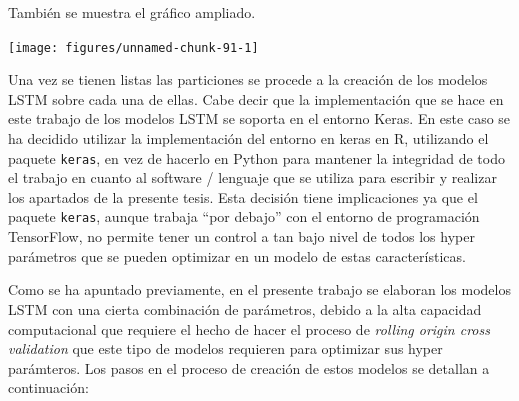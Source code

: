 \documentclass[]{DissertateUSU}
\begin{document}
\setlength\parskip{5ex}
\justifying

\noindent También se muestra el gráfico ampliado.

\begin{center}\texttt{[image: figures/unnamed-chunk-91-1]} \end{center}
\centering

\setlength\parskip{5ex}
\justifying

\noindent Una vez se tienen listas las particiones se procede a la
creación de los modelos LSTM sobre cada una de ellas. Cabe decir que la
implementación que se hace en este trabajo de los modelos LSTM se
soporta en el entorno Keras. En este caso se ha decidido utilizar la
implementación del entorno en keras en R, utilizando el paquete
\texttt{keras}, en vez de hacerlo en Python para mantener la integridad
de todo el trabajo en cuanto al software / lenguaje que se utiliza para
escribir y realizar los apartados de la presente tesis. Esta decisión
tiene implicaciones ya que el paquete \texttt{keras}, aunque trabaja
``por debajo'' con el entorno de programación TensorFlow, no permite
tener un control a tan bajo nivel de todos los hyper parámetros que se
pueden optimizar en un modelo de estas características.

\noindent Como se ha apuntado previamente, en el presente trabajo se
elaboran los modelos LSTM con una cierta combinación de parámetros,
debido a la alta capacidad computacional que requiere el hecho de hacer
el proceso de \emph{rolling origin cross validation} que este tipo de
modelos requieren para optimizar sus hyper parámteros. Los pasos en el
proceso de creación de estos modelos se detallan a continuación:
\end{document}
